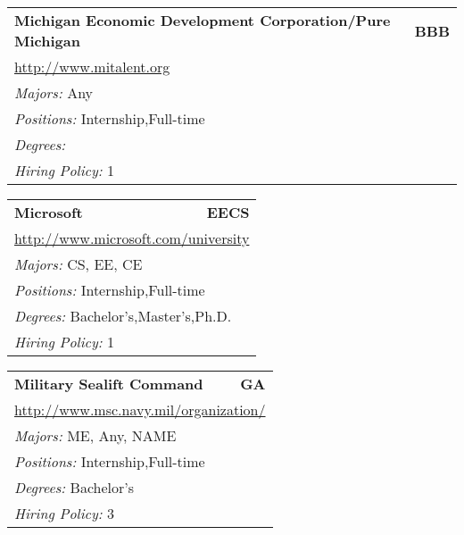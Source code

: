 \documentclass[twoside]{article}
\begin{document}
\begin{center}
\begin{multicols}{3}
\begin{FlushLeft}
\begin{minipage}{\columnwidth}
\end{minipage}
 
\begin{minipage}{\columnwidth}\begin{tabularx}{.95\columnwidth}{Xr}
                 {\Large\bf Michigan Economic Development Corporation/Pure Michigan} & {\Large\bf BBB}\\
    \multicolumn{2}{p{.95\columnwidth}}{\url{http://www.mitalent.org}}\\
    \multicolumn{2}{p{.95\columnwidth}}{\emph{Majors:} Any}\\
    \multicolumn{2}{p{.95\columnwidth}}{\emph{Positions:} Internship,Full-time}\\
    \multicolumn{2}{p{.95\columnwidth}}{\emph{Degrees:} }\\
    \multicolumn{2}{p{.95\columnwidth}}{\emph{Hiring Policy:} 1}\\
    \end{tabularx}
    
\end{minipage}
 
\begin{minipage}{\columnwidth}\begin{tabularx}{.95\columnwidth}{Xr}
                 {\Large\bf Microsoft} & {\Large\bf EECS}\\
    \multicolumn{2}{p{.95\columnwidth}}{\url{http://www.microsoft.com/university}}\\
    \multicolumn{2}{p{.95\columnwidth}}{\emph{Majors:} CS, EE, CE}\\
    \multicolumn{2}{p{.95\columnwidth}}{\emph{Positions:} Internship,Full-time}\\
    \multicolumn{2}{p{.95\columnwidth}}{\emph{Degrees:} Bachelor's,Master's,Ph.D.}\\
    \multicolumn{2}{p{.95\columnwidth}}{\emph{Hiring Policy:} 1}\\
    \end{tabularx}
    
\end{minipage}
 
\begin{minipage}{\columnwidth}\begin{tabularx}{.95\columnwidth}{Xr}
                 {\Large\bf Military Sealift Command} & {\Large\bf GA}\\
    \multicolumn{2}{p{.95\columnwidth}}{\url{http://www.msc.navy.mil/organization/}}\\
    \multicolumn{2}{p{.95\columnwidth}}{\emph{Majors:} ME, Any, NAME}\\
    \multicolumn{2}{p{.95\columnwidth}}{\emph{Positions:} Internship,Full-time}\\
    \multicolumn{2}{p{.95\columnwidth}}{\emph{Degrees:} Bachelor's}\\
    \multicolumn{2}{p{.95\columnwidth}}{\emph{Hiring Policy:} 3}\\
    \end{tabularx}
    

\end{minipage}
\end{FlushLeft}
\end{multicols}
\end{center}
\end{document}
